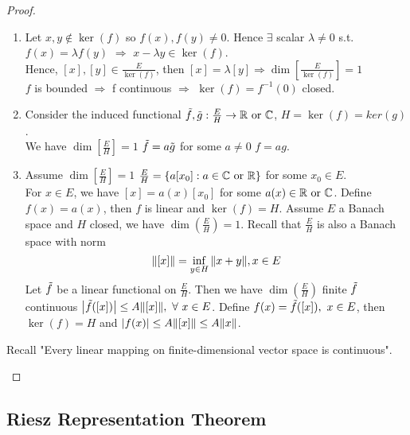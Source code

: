 \begin{proof}\ 
\begin{enumerate}[label = (\alph*)]
    \item Let $x,y \notin \ker(f)$ so $f(x), f(y) \neq 0$. Hence $\exists$ scalar $\lambda \neq 0$ s.t. $f(x) = \lambda f(y)$ $\Rightarrow$ $x - \lambda y \in \ker(f)$.\\
    Hence, $[x],[y] \in \frac{E}{\ker(f)}$, then $[x] = \lambda[y] \Rightarrow \dim[\frac{E}{\ker(f)}] = 1$\\
    $f$ is bounded $\Rightarrow$ f continuous $\Rightarrow$ $\ker(f) = f^{-1}(0)$ closed. 
    \item Consider the induced functional $\Tilde{f}, \Tilde{g}: \frac{E}{H} \to \mathbb{R}\text{ or } \mathbb{C}$, $H = \ker(f) = ker(g)$.\\ We have $\dim[\frac{E}{H}] = 1$ \imply $\Tilde{f} = a \Tilde{g}$ for some $a \neq 0$ \imply $f = ag$.
    \item Assume $\dim[\frac{E}{H}] = 1$ \imply $\frac{E}{H} = \{a [x_0]: a \in \mathbb{C} \text{ or } \mathbb{R}\}$ for some $x_0 \in E$.\\
    For $x \in E$, we have $[x] = a(x) [x_0]$ for some $a(x) \in \mathbb{R} \text{ or } \mathbb{C}$. Define $f(x) = a(x)$, then $f$ is linear and $\ker(f) = H$. Assume $E$ a Banach space and $H$ closed, we have $\dim(\frac{E}{H}) = 1$. Recall that $\frac{E}{H}$ is also a Banach space with norm
    $$\norm{[x]} = \inf_{y \in H} \norm{x + y}, x\in E $$
    Let $\Tilde{f}$ be a linear functional on $\frac{E}{H}$. Then we have $\dim(\frac{E}{H})$ finite \imply $\Tilde{f}$ continuous \imply $\abs{\Tilde{f}([x])} \leq A \norm{[x]},\ \forall\ x \in E$. Define $f(x) = \Tilde{f}([x]),\ x \in E$, then $\ker(f) = H$ and $\abs{f(x)} \leq A \norm{[x]} \leq A \norm{x}$.
\end{enumerate}
\begin{remark}
Recall "Every linear mapping on finite-dimensional vector space is continuous".
\end{remark}
\end{proof}



\vspace{12pt}
\subsection{Riesz Representation Theorem}

